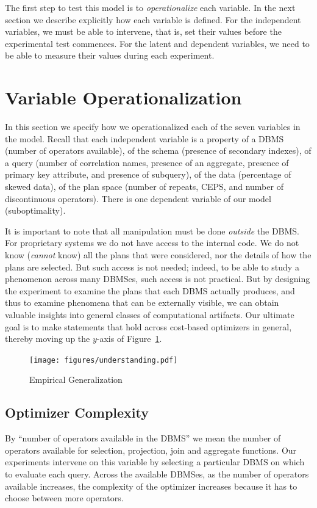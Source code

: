 \documentclass[prodmode,acmtods]{acmsmall}
\begin{document}
The first step to test this model is to {\em operationalize} each
variable. In the next section we describe explicitly how each variable is
defined. For the independent variables, we must be able to intervene, that is,
set their values before the experimental test commences. For the latent and
dependent variables, we need to be able to measure their values during each experiment.

\section{Variable Operationalization}\label{sec:operationalization}

In this section we specify how we operationalized each of the seven
variables in the model.  Recall that each independent variable is a property
of a \hbox{DBMS} (number of operators available), of the schema (presence
  of secondary indexes), of a query (number of correlation names,
presence of an aggregate, presence of primary key attribute, and
presence of subquery), of the data (percentage of skewed data), of
the plan space (number of repeats, CEPS, and number of discontinuous
operators). There is 
one dependent variable of our model (suboptimality).

It is important to note that all manipulation must be done {\em
  outside} the \hbox{DBMS}. For proprietary systems we do not have access to the
internal code. We do not know ({\em cannot} know) all the plans that were
considered, nor the details of how the plans are selected. But such access
is not needed; indeed, to be able to study a phenomenon across many \hbox{DBMSes},
such access is not practical. But by designing the experiment to examine
the plans that each \hbox{DBMS} actually produces, and thus to examine phenomena
that can be externally visible, we can obtain valuable insights into general
classes of computational artifacts. Our ultimate goal is to make statements
that hold across cost-based optimizers in general, thereby moving up the
$y$-axis of Figure~\ref{fig:empirical}.

\begin{figure}[t]
\centering
\texttt{[image: figures/understanding.pdf]}%
\caption{Empirical Generalization\label{fig:empirical}}
\end{figure}


\subsection{Optimizer Complexity}
By ``number of operators available in the \hbox{DBMS}'' we mean the \hbox{number} of operators
available for selection, projection, join and aggregate functions. Our
experiments intervene on this variable by selecting a particular \hbox{DBMS} on
which to evaluate each query. Across the available \hbox{DBMSes}, as the number of
operators available increases, the complexity of the optimizer increases
because it has to choose between more operators.
\end{document}

